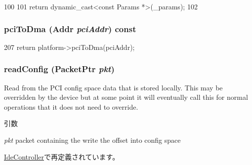 \begin{DoxyCode}
100     {
101         return dynamic_cast<const Params *>(_params);
102     }
\end{DoxyCode}
\hypertarget{classPciDevice_a87078b3d3a28ae134f6736337e90dac3}{
\subsubsection[{pciToDma}]{ pciToDma ({\bf Addr} {\em pciAddr}) const}}
\label{classPciDevice_a87078b3d3a28ae134f6736337e90dac3}



\begin{DoxyCode}
207     { return platform->pciToDma(pciAddr); }
\end{DoxyCode}
\hypertarget{classPciDevice_a9dfb5284eadd79fffef97ba1bd69f3c4}{
\subsubsection[{readConfig}]{ readConfig ({\bf PacketPtr} {\em pkt})}}
\label{classPciDevice_a9dfb5284eadd79fffef97ba1bd69f3c4}
Read from the PCI config space data that is stored locally. This may be overridden by the device but at some point it will eventually call this for normal operations that it does not need to override. 
\begin{DoxyParams}{引数}
\item[{\em pkt}]packet containing the write the offset into config space \end{DoxyParams}


\hyperlink{classIdeController_a9dfb5284eadd79fffef97ba1bd69f3c4}{IdeController}で再定義されています。


